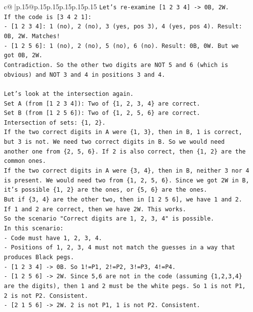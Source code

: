 \documentclass{article}
\begin{document}
{\begin{supertabular}{c@{$\;$}|p{.15\linewidth}@{}p{.15\linewidth}p{.15\linewidth}p{.15\linewidth}p{.15\linewidth}p{.15\linewidth}}
{{{\texttt{Let's re{-}examine {[}1 2 3 4{]} {-}> 0B, 2W.} \\
\texttt{If the code is {[}3 4 2 1{]}:} \\
\texttt{{-} {[}1 2 3 4{]}: 1 (no), 2 (no), 3 (yes, pos 3), 4 (yes, pos 4). Result: 0B, 2W. Matches!} \\
\texttt{{-} {[}1 2 5 6{]}: 1 (no), 2 (no), 5 (no), 6 (no). Result: 0B, 0W. But we got 0B, 2W.} \\
\texttt{Contradiction. So the other two digits are NOT 5 and 6 (which is obvious) and NOT 3 and 4 in positions 3 and 4.} \\
\\ 
\texttt{Let's look at the intersection again.} \\
\texttt{Set A (from {[}1 2 3 4{]}): Two of \{1, 2, 3, 4\} are correct.} \\
\texttt{Set B (from {[}1 2 5 6{]}): Two of \{1, 2, 5, 6\} are correct.} \\
\texttt{Intersection of sets: \{1, 2\}.} \\
\texttt{If the two correct digits in A were \{1, 3\}, then in B, 1 is correct, but 3 is not. We need two correct digits in B. So we would need another one from \{2, 5, 6\}. If 2 is also correct, then \{1, 2\} are the common ones.} \\
\texttt{If the two correct digits in A were \{3, 4\}, then in B, neither 3 nor 4 is present. We would need two from \{1, 2, 5, 6\}. Since we got 2W in B, it's possible \{1, 2\} are the ones, or \{5, 6\} are the ones.} \\
\texttt{But if \{3, 4\} are the other two, then in {[}1 2 5 6{]}, we have 1 and 2. If 1 and 2 are correct, then we have 2W. This works.} \\
\texttt{So the scenario "Correct digits are 1, 2, 3, 4" is possible.} \\
\texttt{In this scenario:} \\
\texttt{{-} Code must have 1, 2, 3, 4.} \\
\texttt{{-} Positions of 1, 2, 3, 4 must not match the guesses in a way that produces Black pegs.} \\
\texttt{{-} {[}1 2 3 4{]} {-}> 0B. So 1!=P1, 2!=P2, 3!=P3, 4!=P4.} \\
\texttt{{-} {[}1 2 5 6{]} {-}> 2W. Since 5,6 are not in the code (assuming \{1,2,3,4\} are the digits), then 1 and 2 must be the white pegs. So 1 is not P1, 2 is not P2. Consistent.} \\
\texttt{{-} {[}2 1 5 6{]} {-}> 2W. 2 is not P1, 1 is not P2. Consistent.} \\
}}}
\end{supertabular}}
\end{document}
